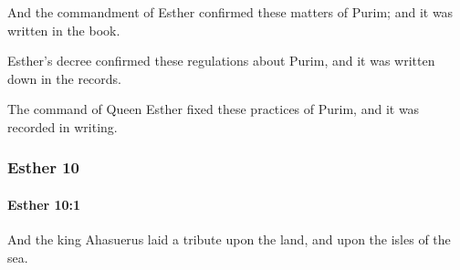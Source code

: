 			\begin{versebox}
					\item[BHS] 
					\item[LXX] 
					\item[ASV] And the commandment of Esther confirmed these matters of Purim; and it was written in the book.
					\item[NIV] Esther’s decree confirmed these regulations about Purim, and it was written down in the records.
					\item[NRSV] The command of Queen Esther fixed these practices of Purim, and it was recorded in writing.
			\end{versebox}
	\subsubsection{Esther 10} %
		\label{ESTHER-10}

		\paragraph{Esther 10:1} %
			\label{ESTHER-10-1}

			And the king Ahasuerus laid a tribute upon the land, and upon the isles of the sea.

